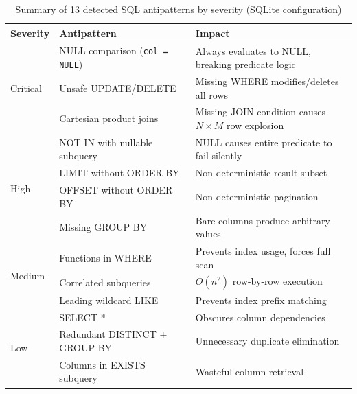\documentclass[print]{einformatica}
\begin{document}
\begin{table}[ht]
    \caption{Summary of 13 detected SQL antipatterns by severity (SQLite configuration)}
    \label{tab:antipattern_summary}
    \centering
    \footnotesize
    \begin{tabular}{llp{}}
        \toprule
        \textbf{Severity} & \textbf{Antipattern} & \textbf{Impact} \\
        \midrule
        \multirow{3}{*}{Critical} & NULL comparison (\texttt{col = NULL}) & Always evaluates to NULL, breaking predicate logic~\cite{date2012sqlrelational} \\
        & Unsafe UPDATE/DELETE & Missing WHERE modifies/deletes all rows~\cite{karwin2010sqlantipatterns} \\
        & Cartesian product joins & Missing JOIN condition causes $N \times M$ row explosion~\cite{ramakrishnan2003dbms} \\
        \midrule
        \multirow{4}{*}{High} & NOT IN with nullable subquery & NULL causes entire predicate to fail silently~\cite{date2012sqlrelational} \\
        & LIMIT without ORDER BY & Non-deterministic result subset~\cite{iso9075_2_2016} \\
        & OFFSET without ORDER BY & Non-deterministic pagination~\cite{iso9075_2_2016} \\
        & Missing GROUP BY & Bare columns produce arbitrary values~\cite{sqliteBareColumns,postgresGroupBy} \\
        \midrule
        \multirow{3}{*}{Medium} & Functions in WHERE & Prevents index usage, forces full scan~\cite{molinaro2020sqlcookbook} \\
        & Correlated subqueries & $O(n^2)$ row-by-row execution~\cite{ramakrishnan2003dbms} \\
        & Leading wildcard LIKE & Prevents index prefix matching~\cite{karwin2010sqlantipatterns} \\
        \midrule
        \multirow{3}{*}{Low} & SELECT * & Obscures column dependencies~\cite{karwin2010sqlantipatterns} \\
        & Redundant DISTINCT + GROUP BY & Unnecessary duplicate elimination~\cite{molinaro2020sqlcookbook} \\
        & Columns in EXISTS subquery & Wasteful column retrieval~\cite{molinaro2020sqlcookbook} \\
        \bottomrule
    \end{tabular}
\end{table}
\end{document}
